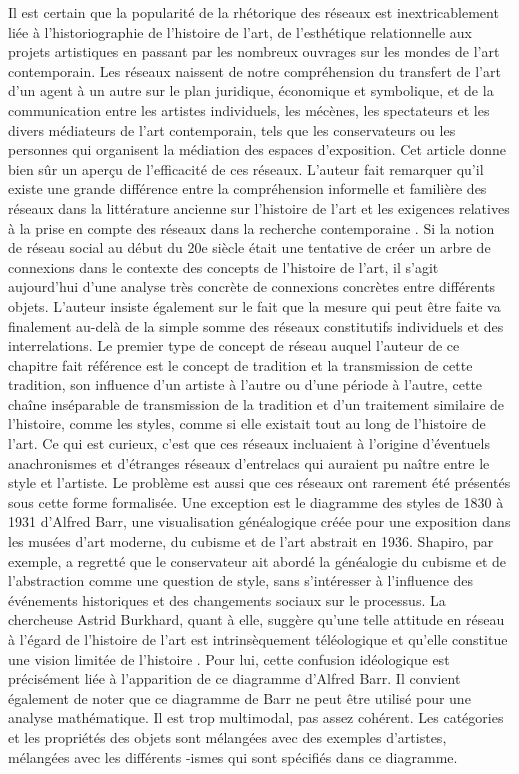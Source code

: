 \documentclass[a4paper, twoside, 12pt]{book}
\begin{document}
Il est certain que la popularité de la rhétorique des réseaux est inextricablement liée à l'historiographie de l'histoire de l'art, de l'esthétique relationnelle aux projets artistiques en passant par les nombreux ouvrages sur les mondes de l'art contemporain. Les réseaux naissent de notre compréhension du transfert de l'art d'un agent à un autre sur le plan juridique, économique et symbolique, et de la communication entre les artistes individuels, les mécènes, les spectateurs et les divers médiateurs de l'art contemporain, tels que les conservateurs ou les personnes qui organisent la médiation des espaces d'exposition. Cet article donne bien sûr un aperçu de l'efficacité de ces réseaux. L'auteur fait remarquer qu'il existe une grande différence entre la compréhension informelle et familière des réseaux dans la littérature ancienne sur l'histoire de l'art et les exigences relatives à la prise en compte des réseaux dans la recherche contemporaine . Si la notion de réseau social au début du 20e siècle était une tentative de créer un arbre de connexions dans le contexte des concepts de l'histoire de l'art, il s'agit aujourd'hui d'une analyse très concrète de connexions concrètes entre différents objets. L'auteur insiste également sur le fait que la mesure qui peut être faite va finalement au-delà de la simple somme des réseaux constitutifs individuels et des interrelations. Le premier type de concept de réseau auquel l'auteur de ce chapitre fait référence est le concept de tradition et la transmission de cette tradition, son influence d'un artiste à l'autre ou d'une période à l'autre, cette chaîne inséparable de transmission de la tradition et d'un traitement similaire de l'histoire, comme les styles, comme si elle existait tout au long de l'histoire de l'art. Ce qui est curieux, c'est que ces réseaux incluaient à l'origine d'éventuels anachronismes et d'étranges réseaux d'entrelacs qui auraient pu naître entre le style et l'artiste. Le problème est aussi que ces réseaux ont rarement été présentés sous cette forme formalisée. Une exception est le diagramme des styles de 1830 à 1931 d'Alfred Barr, une visualisation généalogique créée pour une exposition dans les musées d'art moderne, du cubisme et de l'art abstrait en 1936. Shapiro, par exemple, a regretté que le conservateur ait abordé la généalogie du cubisme et de l'abstraction comme une question de style, sans s'intéresser à l'influence des événements historiques et des changements sociaux sur le processus. La chercheuse Astrid Burkhard, quant à elle, suggère qu'une telle attitude en réseau à l'égard de l'histoire de l'art est intrinsèquement téléologique et qu'elle constitue une vision limitée de l'histoire . Pour lui, cette confusion idéologique est précisément liée à l'apparition de ce diagramme d'Alfred Barr. Il convient également de noter que ce diagramme de Barr ne peut être utilisé pour une analyse mathématique. Il est trop multimodal, pas assez cohérent. Les catégories et les propriétés des objets sont mélangées avec des exemples d'artistes, mélangées avec les différents -ismes qui sont spécifiés dans ce diagramme. 
\end{document}
